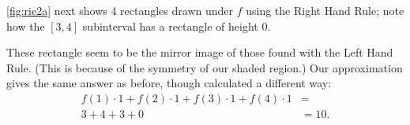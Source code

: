 {\autoref{fig:rie2a} next shows 4 rectangles drawn under $f$ using the Right Hand Rule; note how the $[3,4]$ subinterval has a rectangle of height 0. 


These rectangle seem to be the mirror image of those found with the Left Hand Rule. (This is because of the symmetry of our shaded region.) Our approximation gives the same answer as before, though calculated a different way:
\begin{align*}
 f(1)\cdot 1 + f(2)\cdot 1+ f(3)\cdot 1+f(4)\cdot 1 &=\\
	3+4+3+0&= 10.
\end{align*}

}
